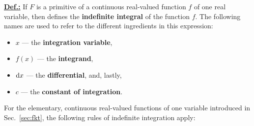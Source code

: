 \medskip
\noindent
\underline{\bf Def.:} If $F$ is a primitive of a continuous 
real-valued function $f$ of one real variable, then
%
\be
{}
\ee
%
defines the {\bf indefinite integral} of the function $f$. The 
following names are used to refer to the different ingredients in 
this expression:
%
\begin{itemize}
\item $x$ --- the {\bf integration variable},
\item $f(x)$ --- the {\bf integrand},
\item ${\rm d}x$ --- the {\bf differential}, and, lastly,
\item $c$ --- the {\bf constant of integration}.
\end{itemize}
%

\medskip
\noindent
For the elementary, continuous real-valued functions of one 
variable introduced in Sec.~\ref{sec:fkt}, the following rules of 
indefinite integration apply:

